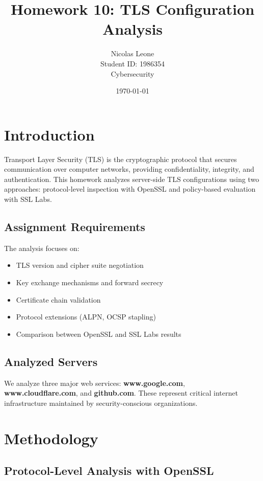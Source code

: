 \documentclass[12pt,a4paper]{article}
\title{Homework 10: TLS Configuration Analysis}
\author{Nicolas Leone\\Student ID: 1986354\\Cybersecurity}
\date{\today}
\begin{document}
\maketitle

\tableofcontents
\clearpage

\section{Introduction}

Transport Layer Security (TLS) is the cryptographic protocol that secures communication over computer networks, providing confidentiality, integrity, and authentication. This homework analyzes server-side TLS configurations using two approaches: protocol-level inspection with OpenSSL and policy-based evaluation with SSL Labs.

\subsection{Assignment Requirements}

The analysis focuses on:
\begin{itemize}
    \item TLS version and cipher suite negotiation
    \item Key exchange mechanisms and forward secrecy
    \item Certificate chain validation
    \item Protocol extensions (ALPN, OCSP stapling)
    \item Comparison between OpenSSL and SSL Labs results
\end{itemize}

\subsection{Analyzed Servers}

We analyze three major web services: \textbf{www.google.com}, \textbf{www.cloudflare.com}, and \textbf{github.com}. These represent critical internet infrastructure maintained by security-conscious organizations.

\section{Methodology}

\subsection{Protocol-Level Analysis with OpenSSL}
\end{document}
